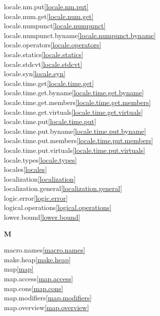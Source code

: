 \begin{multicols}{2}
locale.nm.put\quad\ref{locale.nm.put}\\
locale.num.get\quad\ref{locale.num.get}\\
locale.numpunct\quad\ref{locale.numpunct}\\
locale.numpunct.byname\quad\ref{locale.numpunct.byname}\\
locale.operators\quad\ref{locale.operators}\\
locale.statics\quad\ref{locale.statics}\\
locale.stdcvt\quad\ref{locale.stdcvt}\\
locale.syn\quad\ref{locale.syn}\\
locale.time.get\quad\ref{locale.time.get}\\
locale.time.get.byname\quad\ref{locale.time.get.byname}\\
locale.time.get.members\quad\ref{locale.time.get.members}\\
locale.time.get.virtuals\quad\ref{locale.time.get.virtuals}\\
locale.time.put\quad\ref{locale.time.put}\\
locale.time.put.byname\quad\ref{locale.time.put.byname}\\
locale.time.put.members\quad\ref{locale.time.put.members}\\
locale.time.put.virtuals\quad\ref{locale.time.put.virtuals}\\
locale.types\quad\ref{locale.types}\\
locales\quad\ref{locales}\\
localization\quad\ref{localization}\\
localization.general\quad\ref{localization.general}\\
logic.error\quad\ref{logic.error}\\
logical.operations\quad\ref{logical.operations}\\
lower.bound\quad\ref{lower.bound}\\
\par \textbf{M}\par
macro.names\quad\ref{macro.names}\\
make.heap\quad\ref{make.heap}\\
map\quad\ref{map}\\
map.access\quad\ref{map.access}\\
map.cons\quad\ref{map.cons}\\
map.modifiers\quad\ref{map.modifiers}\\
map.overview\quad\ref{map.overview}\\

\end{multicols}
